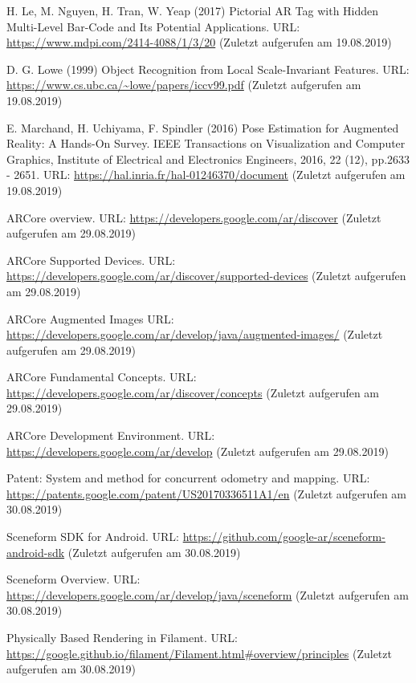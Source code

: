 \documentclass[12pt,oneside]{scrreprt}
\begin{document}
\begin{thebibliography}{10}
 H. Le, M. Nguyen, H. Tran, W. Yeap (2017) Pictorial AR Tag with Hidden Multi-Level Bar-Code and Its Potential Applications. URL: \url{https://www.mdpi.com/2414-4088/1/3/20} (Zuletzt aufgerufen am 19.08.2019)

 D. G. Lowe (1999) Object Recognition from Local Scale-Invariant Features. URL: \url{https://www.cs.ubc.ca/~lowe/papers/iccv99.pdf} (Zuletzt aufgerufen am 19.08.2019)

 E. Marchand, H. Uchiyama, F. Spindler (2016) Pose Estimation for Augmented Reality: A Hands-On Survey. IEEE Transactions on Visualization and Computer Graphics, Institute of Electrical and Electronics Engineers, 2016, 22 (12), pp.2633 - 2651. URL: \url{https://hal.inria.fr/hal-01246370/document} (Zuletzt aufgerufen am 19.08.2019)

 ARCore overview. URL: \url{https://developers.google.com/ar/discover} (Zuletzt aufgerufen am 29.08.2019)

 ARCore Supported Devices. URL: \url{https://developers.google.com/ar/discover/supported-devices} (Zuletzt aufgerufen am 29.08.2019)

 ARCore Augmented Images URL: \url{https://developers.google.com/ar/develop/java/augmented-images/} (Zuletzt aufgerufen am 29.08.2019)

 ARCore Fundamental Concepts. URL: \url{https://developers.google.com/ar/discover/concepts} (Zuletzt aufgerufen am 29.08.2019)

 ARCore Development Environment. URL: \url{https://developers.google.com/ar/develop} (Zuletzt aufgerufen am 29.08.2019)

 Patent: System and method for concurrent odometry and mapping. URL: \url{https://patents.google.com/patent/US20170336511A1/en} (Zuletzt aufgerufen am 30.08.2019)

 Sceneform SDK for Android. URL: \url{https://github.com/google-ar/sceneform-android-sdk} (Zuletzt aufgerufen am 30.08.2019)

 Sceneform Overview. URL: \url{https://developers.google.com/ar/develop/java/sceneform} (Zuletzt aufgerufen am 30.08.2019)

 Physically Based Rendering in Filament. URL: \url{https://google.github.io/filament/Filament.html#overview/principles} (Zuletzt aufgerufen am 30.08.2019)


\end{thebibliography}
\end{document}
